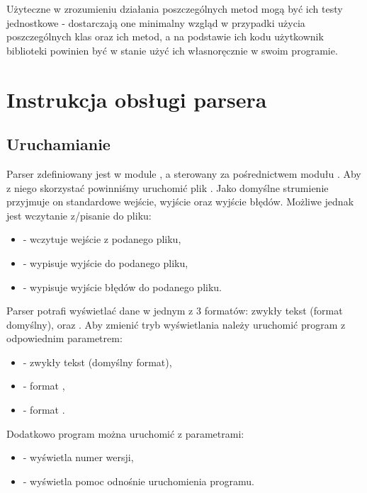 \documentclass[polish]{standalone}
\begin{document}
Użyteczne w zrozumieniu działania poszczególnych metod mogą być ich testy jednostkowe - dostarczają one minimalny wzgląd
w przypadki użycia poszczególnych klas oraz ich metod, a na podstawie ich kodu użytkownik biblioteki powinien być w
stanie użyć ich własnoręcznie w swoim programie.

\chapter{Instrukcja obsługi parsera}

\section{Uruchamianie}

Parser zdefiniowany jest w module , a sterowany za pośrednictwem modułu . Aby z niego skorzystać
powinniśmy uruchomić plik . Jako domyślne strumienie przyjmuje on standardowe wejście, wyjście
oraz wyjście błędów. Możliwe jednak jest wczytanie z/pisanie do pliku:
\begin{itemize}
\item {} - wczytuje wejście z podanego pliku,
\item {} - wypisuje wyjście do podanego pliku,
\item {} - wypisuje wyjście błędów do podanego pliku.
\end{itemize}

Parser potrafi wyświetlać dane w jednym z 3 formatów: zwykły tekst (format domyślny),  oraz . Aby
zmienić tryb wyświetlania należy uruchomić program z odpowiednim parametrem:
\begin{itemize}
\item {} - zwykły tekst (domyślny format),
\item {} - format ,
\item {} - format .
\end{itemize}

Dodatkowo program można uruchomić z parametrami:
\begin{itemize}
\item {} - wyświetla numer wersji,
\item {} - wyświetla pomoc odnośnie uruchomienia programu.
\end{itemize}
\end{document}
